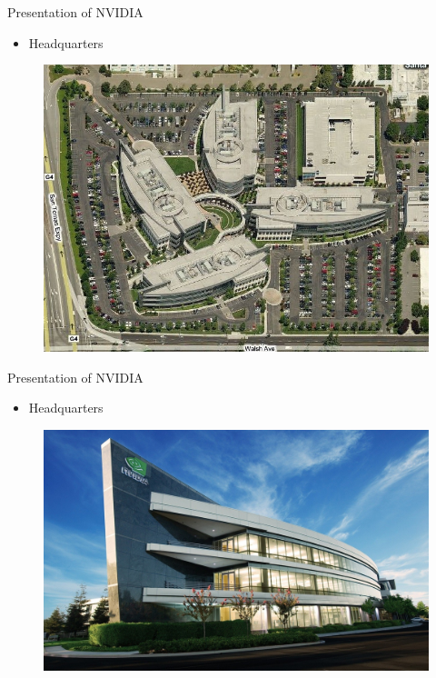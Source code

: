 \documentclass{beamer}
\begin{document}
\begin{frame}{Presentation of NVIDIA}
	\transdissolve[duration=0.08]
	\begin{itemize}
		\item<+->{Headquarters}
	\end{itemize}
	\begin{figure}[h]
		\includegraphics[width=1.00\textheight]{nvidia_locaux.jpg}
	\end{figure}
\end{frame}

\begin{frame}{Presentation of NVIDIA}
	\transdissolve[duration=0.08]
	\begin{itemize}
		\item<+->{Headquarters}
	\end{itemize}
	\begin{figure}[h]
		\includegraphics[width=1.00\textheight]{NVIDIA_HEADQUARTERS.jpg}
	\end{figure}
\end{frame}
\end{document}
